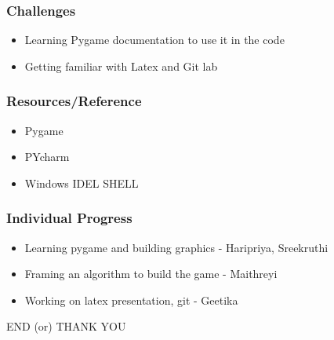 \documentclass[14pt]{beamer}
\begin{document}
    \begin{frame}
	\frametitle{Challenges}
        \begin{itemize}
	    \item Learning Pygame documentation to use it in the code
            \item Getting familiar with Latex and Git lab
        \end{itemize}
    \end{frame}
    \begin{frame}
	\frametitle{Resources/Reference}
	\begin{itemize}
		\item Pygame
                 \item PYcharm
                 \item Windows IDEL SHELL
	\end{itemize}
    \end{frame}
    \begin{frame}
	\frametitle{Individual Progress}
        \begin{itemize}
	     \item Learning pygame and building graphics - Haripriya, Sreekruthi
	     \item Framing an algorithm to build the game - Maithreyi
             \item Working on latex presentation, git - Geetika
        \end{itemize}
    \end{frame}
    
    \begin{frame}
	\begin{center}
	     END (or) THANK YOU
	\end{center}
    \end{frame}
\end{document}

